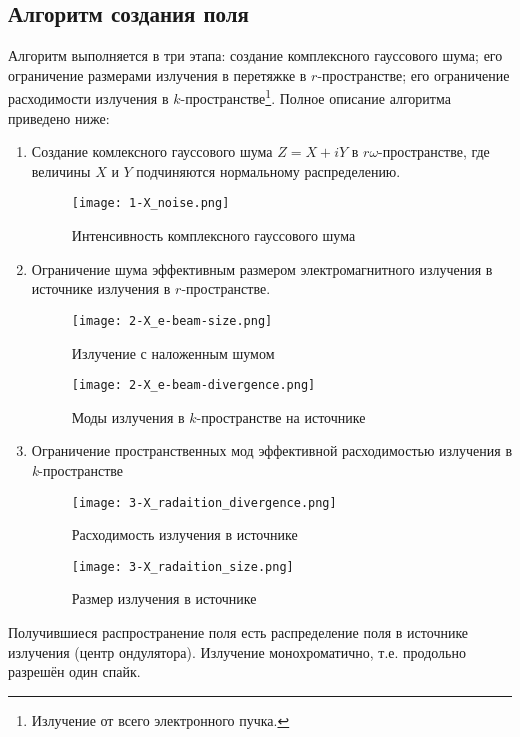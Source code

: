 \subsection{Алгоритм создания поля}
Алгоритм выполняется в три этапа: создание комплексного гауссового шума; его ограничение размерами излучения в перетяжке в $r$-пространстве; его ограничение расходимости излучения в $k$-пространстве\footnote{Излучение от всего электронного пучка.}. Полное описание алгоритма приведено ниже: 
\begin{enumerate}
\item \label{noise} Создание комлексного гауссового шума $Z = X + iY$ в $r\omega$-пространстве, где величины $X$ и $Y$ подчиняются нормальному распределению.
\begin{figure}[H] 
	\centering 	\texttt{[image: 1-X\_noise.png]}
	\caption{Интенсивность комплексного гауссового шума}
	\label{fig:1-noise}
\end{figure}
\item \label{beam_s} Ограничение шума эффективным размером электромагнитного излучения в источнике излучения в \textit{$r$}-пространстве.
\begin{figure}[H]
	\centering
	\begin{minipage}{0.45\textwidth}
		\centering
		\texttt{[image: 2-X\_e-beam-size.png]}
		\caption{Излучение с наложенным шумом}
		\label{fig:2-beam_size_k}
	\end{minipage}
	\begin{minipage}{0.45\textwidth}
		\centering
		\texttt{[image: 2-X\_e-beam-divergence.png]}
		\caption{Моды излучения в $k$-пространстве на источнике}
		\label{fig:2-beam_size_s}
	\end{minipage}\hfill
\end{figure}
\item \label{beam_k} Ограничение пространственных мод эффективной расходимостью излучения в \textit{k}-пространстве
\begin{figure}[H]
	\centering
	\begin{minipage}{0.45\textwidth}
		\centering
		\texttt{[image: 3-X\_radaition\_divergence.png]}
		\caption{Расходимость излучения в источнике}
		\label{fig:3-beam_s}
	\end{minipage}
	\begin{minipage}{0.45\textwidth}
		\centering
		\texttt{[image: 3-X\_radaition\_size.png]}
		\caption{Размер излучения в источнике}
		\label{fig:3-beam_k}
	\end{minipage}
\end{figure}
\end{enumerate}
\noindent Получившиеся распространение поля есть распределение поля в источнике излучения (центр ондулятора). Излучение монохроматично, т.е. продольно разрешён один спайк.

